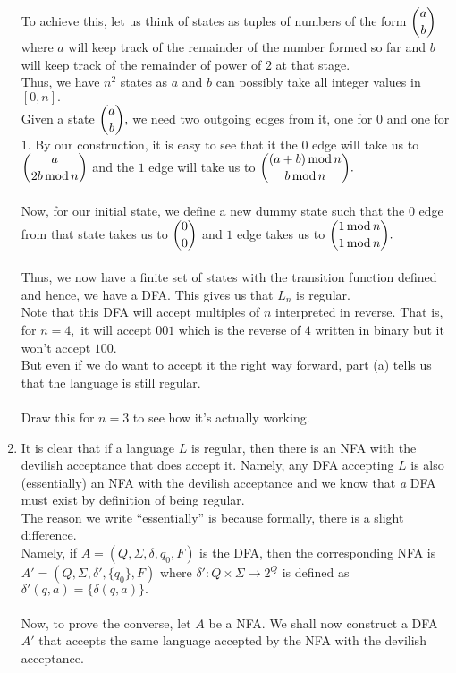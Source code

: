 \documentclass{article}
\begin{document}
\begin{enumerate}[label = \arabic*.]
	To achieve this, let us think of states as tuples of numbers of the form $\dbinom{a}{b}$ where $a$ will keep track of the remainder of the number formed so far and $b$ will keep track of the remainder of power of $2$ at that stage.\\
	Thus, we have $n^2$ states as $a$ and $b$ can possibly take all integer values in $[0, n].$\\
	Given a state $\dbinom{a}{b},$ we need two outgoing edges from it, one for $0$ and one for $1.$ By our construction, it is easy to see that it the $0$ edge will take us to $\dbinom{a}{2b  \operatorname{mod} n}$ and the $1$ edge will take us to $\dbinom{(a + b)  \operatorname{mod} n}{b  \operatorname{mod} n}.$\\~\\
	Now, for our initial state, we define a new dummy state such that the $0$ edge from that state takes us to $\dbinom{0}{0}$ and $1$ edge takes us to $\dbinom{1  \operatorname{mod} n}{1  \operatorname{mod} n}.$\\~\\
	Thus, we now have a finite set of states with the transition function defined and hence, we have a DFA. This gives us that $L_n$ is regular.\\
	Note that this DFA will accept multiples of $n$ interpreted in reverse. That is, for $n = 4,$ it will accept $001$ which is the reverse of $4$ written in binary but it won't accept $100.$\\
	But even if we do want to accept it the right way forward, part (a) tells us that the language is still regular.\\~\\
	Draw this for $n = 3$ to see how it's actually working.
	\item It is clear that if a language $L$ is regular, then there is an NFA with the devilish acceptance that does accept it. Namely, any DFA accepting $L$ is also (essentially) an NFA with the devilish acceptance and we know that \emph{a} DFA must exist by definition of being regular.\\
	The reason we write ``essentially'' is because formally, there is a slight difference.\\
	Namely, if $A = (Q, \Sigma, \delta, q_0, F)$ is the DFA, then the corresponding NFA is $A ' = (Q, \Sigma, \delta', \{q_0\}, F)$ where $\delta':Q\times\Sigma\to2^Q$ is defined as $\delta'(q, a) = \{\delta(q, a)\}.$\\~\\
	Now, to prove the converse, let $A$ be a NFA. We shall now construct a DFA $A'$ that accepts the same language accepted by the NFA with the devilish acceptance.\\

\end{enumerate}
\end{document}
